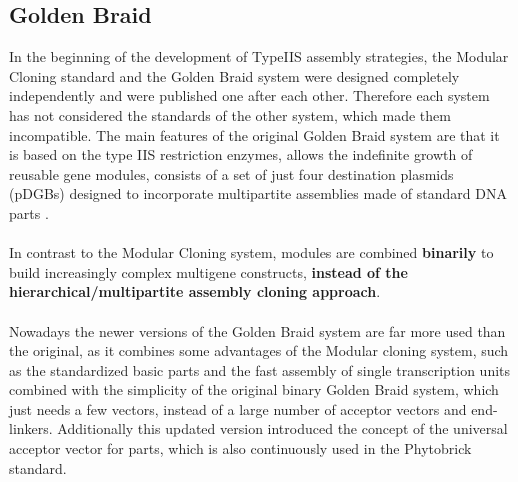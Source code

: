 \subsection{Golden Braid}
In the beginning of the development of TypeIIS assembly strategies, the Modular Cloning standard and the Golden Braid system were designed completely independently and were published one after each other. Therefore each system has not considered the standards of the other system, which made them incompatible. 
The main features of the original Golden Braid system are that it is based on the type IIS restriction enzymes, allows the indefinite growth of reusable gene modules, consists of a set of just four destination plasmids (pDGBs) designed to incorporate multipartite assemblies made of standard DNA parts \parencite{Sarrion-Perdigones2011}.  \\ \\
In contrast to the Modular Cloning system, modules are combined \textbf{binarily} to build increasingly complex multigene constructs, \textbf{instead of the hierarchical/multipartite assembly cloning approach}. \\ \\
Nowadays the newer versions of the Golden Braid system \parencite{Sarrion-Perdigones2013} are far more used than the original, as it combines some advantages of the Modular cloning system, such as the standardized basic parts and the fast assembly of single transcription units combined with the simplicity of the original binary Golden Braid system, which just needs a few vectors, instead of a large number of acceptor vectors and end-linkers. Additionally this updated version introduced the concept of the universal acceptor vector for parts, which is also continuously used in the Phytobrick standard.

